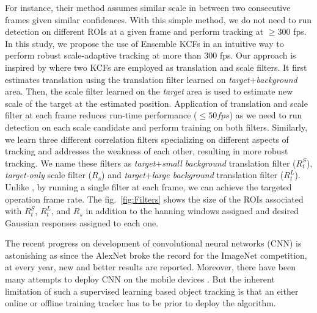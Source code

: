 \documentclass[10pt,twocolumn,letterpaper]{article}
\newcounter{ct}
\begin{document}
For instance, their method assumes similar scale in between two
consecutive frames given similar confidences. With this simple method,
we do not need to run detection on different ROIs at a given frame and
perform tracking at $\geq300$ fps. In this study, we propose the use
of Ensemble KCFs in an intuitive way to perform robust scale-adaptive
tracking at more than $300$ fps. Our approach is inspired by
\cite{ma2015long} where two KCFs are employed as translation and scale
filters. It first estimates translation using the translation filter
learned on \textit{target}$+$\textit{background} area. Then, the scale
filter learned on the \textit{target} area is used to estimate new
scale of the target at the estimated position. Application of
translation and scale filter at each frame reduces run-time
performance ($\leq50 fps$) as we need to run detection on each scale
candidate and perform training on both filters. Similarly, we learn
three different correlation filters specializing on different aspects
of tracking and addresses the weakness of each other, resulting in
more robust tracking. We name these filters as
\textit{target}+\textit{small background} translation filter
($R_{t}^{S}$), \textit{target-only} scale filter ($R_{s}$) and
\textit{target}+\textit{large background} translation filter
($R_{t}^{L}$). Unlike \cite{ma2015long}, by running a single filter at
each frame, we can achieve the targeted operation frame rate. The
fig.~\ref{fig:Filters} shows the size of the ROIs associated with
$R_{t}^{S}$, $R_{t}^{L}$, and $R_{s}$ in addition to the hanning
windows assigned and desired Gaussian responses assigned to each one.

The recent progress on development of convolutional neural networks
(CNN) is astonishing as since the AlexNet \cite{krizhevsky12} broke
the record for the ImageNet competition, at every year, new and better
results are reported. Moreover, there have been many attempts to
deploy CNN on the mobile devices
\cite{wu2016quantized,giusti2015}. But the inherent limitation of such
a supervised learning based object tracking is that an either online
\cite{nam2016} or offline \cite{held2016} training tracker has to be
prior to deploy the algorithm.
\end{document}

